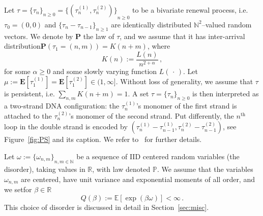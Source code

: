 \documentclass[AHL,Unicode,longabstracts]{cedram}
\DeclareMathOperator{\tHt}{th}
\newcommand{\ga}{\alpha}
\newcommand{\bP}{\ensuremath{\mathbf{P}}}
\newcommand{\bE}{\ensuremath{\mathbf{E}}}
\newcommand{\bbE}{\ensuremath{\mathbb{E}}}
\newcommand{\bbN}{\ensuremath{\mathbb{N}}}
\newcommand{\bbP}{\ensuremath{\mathbb{P}}}
\newcommand{\bbR}{\ensuremath{\mathbb{R}}}
\begin{document}
Let $\tau = {\lbrace \tau_n \rbrace}_{n\geq 0}= {\lbrace (\tau_n^{(1)}, \tau_n^{(2)}) \rbrace}_{n\geq 0}$ to be a bivariate renewal process, i.e. $\tau_0 = (0,0)$ and $\{ \tau_{n} - \tau_{n-1}\}_{n \geq 1}$ are identically distributed $\mathbb{N}^2$--valued random vectors. We denote by $\bP$ the law of $\tau$, and we assume that it has inter-arrival distribution\linebreak $\bP(\tau_1= (n,m))= K(n+m)$, where
\begin{equation}\label{def:Kn}
K(n) := \frac{L(n)}{n^{2+\ga}}\,,
\end{equation}
for some $\ga \ge 0$ and some slowly varying function $L({\,\cdot\,})$. Let $\mu := \bE [\tau_1^{(1)}]= \bE [\tau_1^{(2)}]\in (1, \infty]$. Without loss of generality, we assume that $\tau$ is persistent, i.e. $\sum_{n,m} K(n+m) =1$. A set $\tau={\lbrace \tau_n \rbrace}_{n\geq 0}$ is then interpreted as a two-strand DNA configuration: the $\tau_n^{(1)}$'s monomer of the first strand is attached to the $\tau_n^{(2)}$'s monomer of the second strand. Put differently, the $n^{\tHt}$ loop in the double strand is encoded by $(\tau_n^{(1)}-\tau_{n-1}^{(1)},\tau_n^{(2)}-\tau_{n-1}^{(2)})$, see Figure~\ref{fig:PS} and its caption. We refer to~\cite{cf:GK} for further details.

Let $ \omega := { \lbrace \omega_{n,m} \rbrace }_{n,m \in \bbN}$ be a sequence of IID centered random variables (the disorder), taking values in $\bbR$, with law denoted $\bbP$. We assume that the variables $\omega_{n,m}$ are centered, have unit variance and exponential moments of all order, and we set\linebreak for $\beta \in \bbR$
\begin{equation}\label{eq:defQ}
Q(\beta) := \bbE [\exp(\beta \omega)] < \infty\,.
\end{equation}
This choice of disorder is discussed in detail in Section~\ref{sec:misc}.
\end{document}
